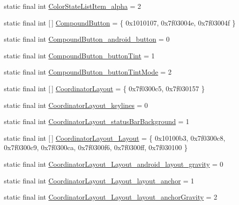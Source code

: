 \begin{DoxyCompactItemize}
static final int \mbox{\hyperlink{classandroid_1_1support_1_1design_1_1_r_1_1styleable_af469ede1aced51d93b9cf6e08ca6ba14}{Color\+State\+List\+Item\+\_\+alpha}} = 2
\item 
static final int \mbox{[}$\,$\mbox{]} \mbox{\hyperlink{classandroid_1_1support_1_1design_1_1_r_1_1styleable_a1e3ef000b9dccc62673df5ec6d13a547}{Compound\+Button}} = \{ 0x1010107, 0x7f03004e, 0x7f03004f \}
\item 
static final int \mbox{\hyperlink{classandroid_1_1support_1_1design_1_1_r_1_1styleable_a6d7b51f19ad5b7b394b8fc42c69a09ec}{Compound\+Button\+\_\+android\+\_\+button}} = 0
\item 
static final int \mbox{\hyperlink{classandroid_1_1support_1_1design_1_1_r_1_1styleable_a25cff95b0d756209d7642094cbd4e19d}{Compound\+Button\+\_\+button\+Tint}} = 1
\item 
static final int \mbox{\hyperlink{classandroid_1_1support_1_1design_1_1_r_1_1styleable_a11e8a842e9e3521d89857eb2305fcbb8}{Compound\+Button\+\_\+button\+Tint\+Mode}} = 2
\item 
static final int \mbox{[}$\,$\mbox{]} \mbox{\hyperlink{classandroid_1_1support_1_1design_1_1_r_1_1styleable_aa61378a506fc889e9e7af20a32b5fa05}{Coordinator\+Layout}} = \{ 0x7f0300c5, 0x7f030157 \}
\item 
static final int \mbox{\hyperlink{classandroid_1_1support_1_1design_1_1_r_1_1styleable_ac5dda80c68ac3d8d0bcb7678440d480b}{Coordinator\+Layout\+\_\+keylines}} = 0
\item 
static final int \mbox{\hyperlink{classandroid_1_1support_1_1design_1_1_r_1_1styleable_ae040b68b75d343e4cf3c87d18acb3605}{Coordinator\+Layout\+\_\+status\+Bar\+Background}} = 1
\item 
static final int \mbox{[}$\,$\mbox{]} \mbox{\hyperlink{classandroid_1_1support_1_1design_1_1_r_1_1styleable_a3646925ce337cd6de11e60a4cff99e3a}{Coordinator\+Layout\+\_\+\+Layout}} = \{ 0x10100b3, 0x7f0300c8, 0x7f0300c9, 0x7f0300ca, 0x7f0300f6, 0x7f0300ff, 0x7f030100 \}
\item 
static final int \mbox{\hyperlink{classandroid_1_1support_1_1design_1_1_r_1_1styleable_a46dbd9e454b13320d280d9f354b24edc}{Coordinator\+Layout\+\_\+\+Layout\+\_\+android\+\_\+layout\+\_\+gravity}} = 0
\item 
static final int \mbox{\hyperlink{classandroid_1_1support_1_1design_1_1_r_1_1styleable_aa98d5a28d6e19b7dfd984a765c0853b9}{Coordinator\+Layout\+\_\+\+Layout\+\_\+layout\+\_\+anchor}} = 1
\item 
static final int \mbox{\hyperlink{classandroid_1_1support_1_1design_1_1_r_1_1styleable_ad43d74622cee0a43176d15c74b03d153}{Coordinator\+Layout\+\_\+\+Layout\+\_\+layout\+\_\+anchor\+Gravity}} = 2

\end{DoxyCompactItemize}
